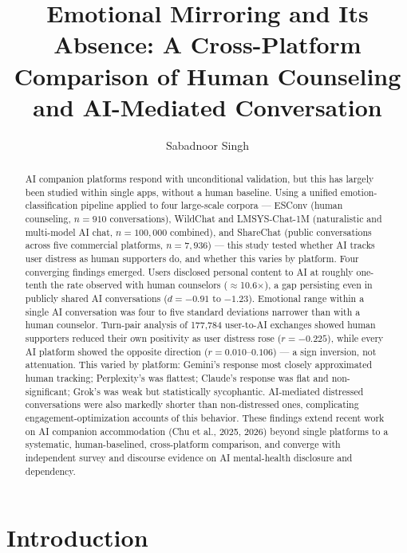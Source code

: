 \documentclass[11pt]{article}
\title{Emotional Mirroring and Its Absence: A Cross-Platform Comparison of Human Counseling and AI-Mediated Conversation}
\author{Sabadnoor Singh}
\affil{Independent Researcher}
\date{}
\begin{document}
\maketitle

\begin{abstract}
AI companion platforms respond with unconditional validation, but this has largely been studied within single apps, without a human baseline. Using a unified emotion-classification pipeline applied to four large-scale corpora --- ESConv (human counseling, $n = 910$ conversations), WildChat and LMSYS-Chat-1M (naturalistic and multi-model AI chat, $n = 100{,}000$ combined), and ShareChat (public conversations across five commercial platforms, $n = 7{,}936$) --- this study tested whether AI tracks user distress as human supporters do, and whether this varies by platform. Four converging findings emerged. Users disclosed personal content to AI at roughly one-tenth the rate observed with human counselors ($\approx$10.6$\times$), a gap persisting even in publicly shared AI conversations ($d = -0.91$ to $-1.23$). Emotional range within a single AI conversation was four to five standard deviations narrower than with a human counselor. Turn-pair analysis of 177{,}784 user-to-AI exchanges showed human supporters reduced their own positivity as user distress rose ($r = -0.225$), while every AI platform showed the opposite direction ($r = 0.010$--$0.106$) --- a sign inversion, not attenuation. This varied by platform: Gemini's response most closely approximated human tracking; Perplexity's was flattest; Claude's response was flat and non-significant; Grok's was weak but statistically sycophantic. AI-mediated distressed conversations were also markedly shorter than non-distressed ones, complicating engagement-optimization accounts of this behavior. These findings extend recent work on AI companion accommodation (Chu et al., 2025, 2026) beyond single platforms to a systematic, human-baselined, cross-platform comparison, and converge with independent survey and discourse evidence on AI mental-health disclosure and dependency.
\end{abstract}

\section{Introduction}
\end{document}
